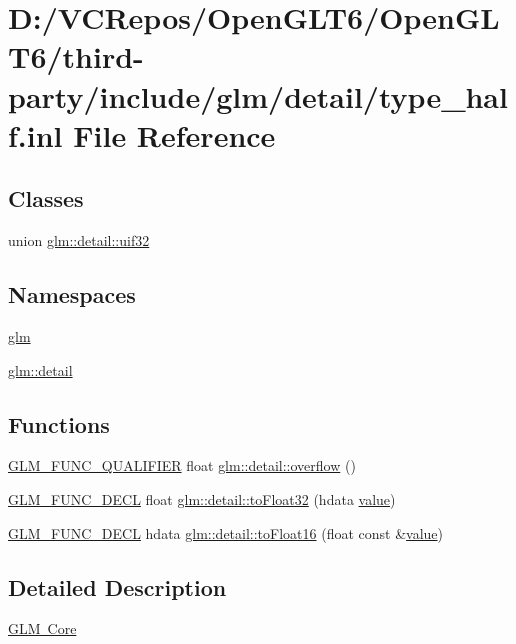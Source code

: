 \hypertarget{type__half_8inl}{}\section{D\+:/\+V\+C\+Repos/\+Open\+G\+L\+T6/\+Open\+G\+L\+T6/third-\/party/include/glm/detail/type\+\_\+half.inl File Reference}
\label{type__half_8inl}
\subsection*{Classes}
\begin{DoxyCompactItemize}
\item 
union \mbox{\hyperlink{unionglm_1_1detail_1_1uif32}{glm\+::detail\+::uif32}}
\end{DoxyCompactItemize}
\subsection*{Namespaces}
\begin{DoxyCompactItemize}
\item 
 \mbox{\hyperlink{namespaceglm}{glm}}
\item 
 \mbox{\hyperlink{namespaceglm_1_1detail}{glm\+::detail}}
\end{DoxyCompactItemize}
\subsection*{Functions}
\begin{DoxyCompactItemize}
\item 
\mbox{\hyperlink{setup_8hpp_a33fdea6f91c5f834105f7415e2a64407}{G\+L\+M\+\_\+\+F\+U\+N\+C\+\_\+\+Q\+U\+A\+L\+I\+F\+I\+ER}} float \mbox{\hyperlink{namespaceglm_1_1detail_a61efe122333bc00e81c57e0927bfdfb3}{glm\+::detail\+::overflow}} ()
\item 
\mbox{\hyperlink{setup_8hpp_ab2d052de21a70539923e9bcbf6e83a51}{G\+L\+M\+\_\+\+F\+U\+N\+C\+\_\+\+D\+E\+CL}} float \mbox{\hyperlink{namespaceglm_1_1detail_a8e4719d94d99ee1e625496e04317272b}{glm\+::detail\+::to\+Float32}} (hdata \mbox{\hyperlink{glad_8h_a03aff08f73d7fde3d1a08e0abd8e84fa}{value}})
\item 
\mbox{\hyperlink{setup_8hpp_ab2d052de21a70539923e9bcbf6e83a51}{G\+L\+M\+\_\+\+F\+U\+N\+C\+\_\+\+D\+E\+CL}} hdata \mbox{\hyperlink{namespaceglm_1_1detail_ac16321696a34b41c55f941b319d50652}{glm\+::detail\+::to\+Float16}} (float const \&\mbox{\hyperlink{glad_8h_a03aff08f73d7fde3d1a08e0abd8e84fa}{value}})
\end{DoxyCompactItemize}


\subsection{Detailed Description}
\mbox{\hyperlink{group__core}{G\+LM Core}} 